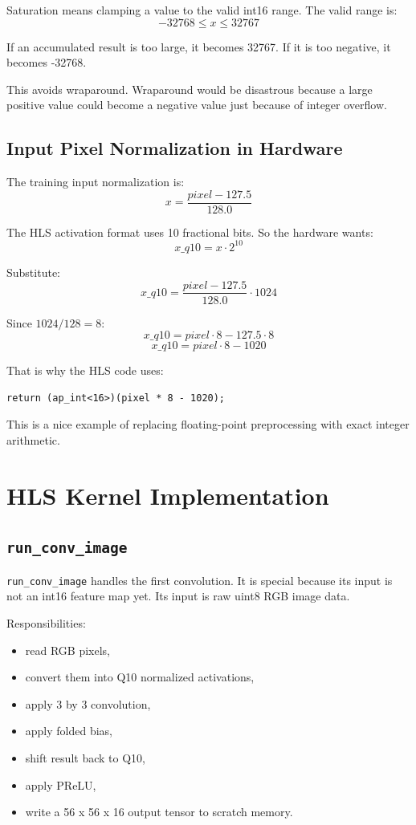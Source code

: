 \documentclass[11pt]{article}
\newcommand{\code}[1]{\texttt{#1}}
\begin{document}
Saturation means clamping a value to the valid int16 range.
The valid range is:
\[
  -32768 \le x \le 32767
\]

If an accumulated result is too large, it becomes 32767.
If it is too negative, it becomes -32768.

This avoids wraparound.
Wraparound would be disastrous because a large positive value could become a negative value just because of integer overflow.

\subsection{Input Pixel Normalization in Hardware}

The training input normalization is:
\[
  x = \frac{pixel - 127.5}{128.0}
\]

The HLS activation format uses 10 fractional bits.
So the hardware wants:
\[
  x\_q10 = x \cdot 2^{10}
\]

Substitute:
\[
  x\_q10 =
  \frac{pixel - 127.5}{128.0} \cdot 1024
\]

Since \(1024 / 128 = 8\):
\[
  x\_q10 = pixel \cdot 8 - 127.5 \cdot 8
\]
\[
  x\_q10 = pixel \cdot 8 - 1020
\]

That is why the HLS code uses:

\begin{lstlisting}
return (ap_int<16>)(pixel * 8 - 1020);
\end{lstlisting}

This is a nice example of replacing floating-point preprocessing with exact integer arithmetic.

\section{HLS Kernel Implementation}

\subsection{\code{run\_conv\_image}}

\code{run\_conv\_image} handles the first convolution.
It is special because its input is not an int16 feature map yet.
Its input is raw uint8 RGB image data.

Responsibilities:

\begin{itemize}[leftmargin=1.4em]
  \item read RGB pixels,
  \item convert them into Q10 normalized activations,
  \item apply 3 by 3 convolution,
  \item apply folded bias,
  \item shift result back to Q10,
  \item apply PReLU,
  \item write a 56 x 56 x 16 output tensor to scratch memory.
\end{itemize}
\end{document}
